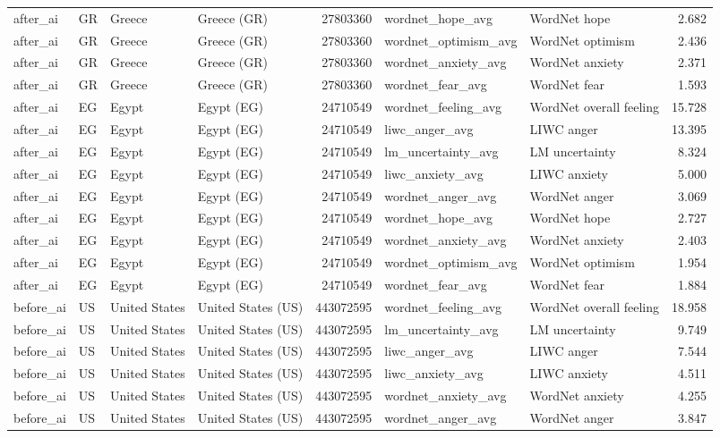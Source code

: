 \begin{tabular}{llllrllr}
after\_ai & GR & Greece & Greece (GR) & 27803360 & wordnet\_hope\_avg & WordNet hope & 2.682 \\
after\_ai & GR & Greece & Greece (GR) & 27803360 & wordnet\_optimism\_avg & WordNet optimism & 2.436 \\
after\_ai & GR & Greece & Greece (GR) & 27803360 & wordnet\_anxiety\_avg & WordNet anxiety & 2.371 \\
after\_ai & GR & Greece & Greece (GR) & 27803360 & wordnet\_fear\_avg & WordNet fear & 1.593 \\
after\_ai & EG & Egypt & Egypt (EG) & 24710549 & wordnet\_feeling\_avg & WordNet overall feeling & 15.728 \\
after\_ai & EG & Egypt & Egypt (EG) & 24710549 & liwc\_anger\_avg & LIWC anger & 13.395 \\
after\_ai & EG & Egypt & Egypt (EG) & 24710549 & lm\_uncertainty\_avg & LM uncertainty & 8.324 \\
after\_ai & EG & Egypt & Egypt (EG) & 24710549 & liwc\_anxiety\_avg & LIWC anxiety & 5.000 \\
after\_ai & EG & Egypt & Egypt (EG) & 24710549 & wordnet\_anger\_avg & WordNet anger & 3.069 \\
after\_ai & EG & Egypt & Egypt (EG) & 24710549 & wordnet\_hope\_avg & WordNet hope & 2.727 \\
after\_ai & EG & Egypt & Egypt (EG) & 24710549 & wordnet\_anxiety\_avg & WordNet anxiety & 2.403 \\
after\_ai & EG & Egypt & Egypt (EG) & 24710549 & wordnet\_optimism\_avg & WordNet optimism & 1.954 \\
after\_ai & EG & Egypt & Egypt (EG) & 24710549 & wordnet\_fear\_avg & WordNet fear & 1.884 \\
before\_ai & US & United States & United States (US) & 443072595 & wordnet\_feeling\_avg & WordNet overall feeling & 18.958 \\
before\_ai & US & United States & United States (US) & 443072595 & lm\_uncertainty\_avg & LM uncertainty & 9.749 \\
before\_ai & US & United States & United States (US) & 443072595 & liwc\_anger\_avg & LIWC anger & 7.544 \\
before\_ai & US & United States & United States (US) & 443072595 & liwc\_anxiety\_avg & LIWC anxiety & 4.511 \\
before\_ai & US & United States & United States (US) & 443072595 & wordnet\_anxiety\_avg & WordNet anxiety & 4.255 \\
before\_ai & US & United States & United States (US) & 443072595 & wordnet\_anger\_avg & WordNet anger & 3.847 \\

\end{tabular}
